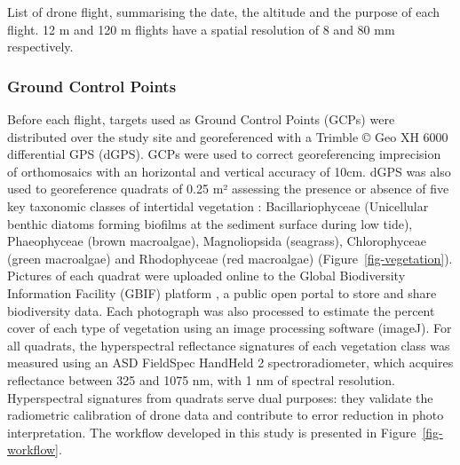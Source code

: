 \documentclass[
  number]{elsarticle}
\begin{document}
\begin{table}

\caption{\label{tbl-flights}List of drone flight, summarising the date,
the altitude and the purpose of each flight. 12 m and 120 m flights have
a spatial resolution of 8 and 80 mm respectively.}


\end{table}%

\subsubsection{Ground Control Points}\label{ground-control-points}

Before each flight, targets used as Ground Control Points (GCPs) were
distributed over the study site and georeferenced with a Trimble © Geo
XH 6000 differential GPS (dGPS). GCPs were used to correct
georeferencing imprecision of orthomosaics with an horizontal and
vertical accuracy of 10cm. dGPS was also used to georeference quadrats
of 0.25 m² assessing the presence or absence of five key taxonomic
classes of intertidal vegetation : Bacillariophyceae (Unicellular
benthic diatoms forming biofilms at the sediment surface during low
tide), Phaeophyceae (brown macroalgae), Magnoliopsida (seagrass),
Chlorophyceae (green macroalgae) and Rhodophyceae (red macroalgae)
(Figure~\ref{fig-vegetation}). Pictures of each quadrat were uploaded
online to the Global Biodiversity Information Facility (GBIF) platform
\citep{BedeGbif}, a public open portal to store and share biodiversity
data. Each photograph was also processed to estimate the percent cover
of each type of vegetation using an image processing software (imageJ).
For all quadrats, the hyperspectral reflectance signatures of each
vegetation class was measured using an ASD FieldSpec HandHeld 2
spectroradiometer, which acquires reflectance between 325 and 1075 nm,
with 1 nm of spectral resolution. Hyperspectral signatures from quadrats
serve dual purposes: they validate the radiometric calibration of drone
data and contribute to error reduction in photo interpretation. The
workflow developed in this study is presented in
Figure~\ref{fig-workflow}.
\end{document}

